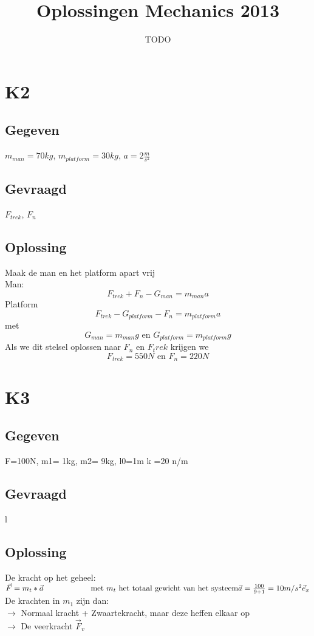 \documentclass[10pt,a4paper]{article}
\title{Oplossingen Mechanics 2013}
\author{TODO}
\begin{document}
\maketitle
\pagebreak
\tableofcontents
\pagebreak

\section*{K2}
\subsection*{Gegeven}
$m_{man} = 70kg$, $m_{platform} = 30kg$, $a=2\frac{m}{s^2}$ 
\subsection*{Gevraagd}
$F_{trek}$, $F_n$
\subsection*{Oplossing}
Maak de man en het platform apart vrij\\
Man:
\[
F_{trek} + F_n - G_{man} = m_{man} a
\]
Platform
\[
F_{trek} - G_{platform} - F_n = m_{platform}a
\]
met
\[
G_{man} = m_{man}g \text{ en } G_{platform} = m_{platform}g
\]
Als we dit stelsel oplossen naar $F_n$ en $F_trek$ krijgen we
\[
F_{trek} = 550N \text{ en } F_n = 220N
\]

\section*{K3}
\subsection*{Gegeven}
F=100N, m1= 1kg, m2= 9kg, l0=1m k =20 n/m
\subsection*{Gevraagd}
l
\subsection*{Oplossing}
De kracht op het geheel:\\
$\vec{F} = m_t * \vec{a}\text{\hspace{2cm} met $m_t$ het totaal gewicht van het systeem}\\
\vec{a} = \frac{100}{9+1} = 10 m/s^2 \vec{e}_x$\\

\noindent De krachten in $m_1$ zijn dan:\\
$\rightarrow$ Normaal kracht + Zwaartekracht, maar deze heffen elkaar op\\
$\rightarrow$ De veerkracht $\vec{F}_v$\\
\end{document}
